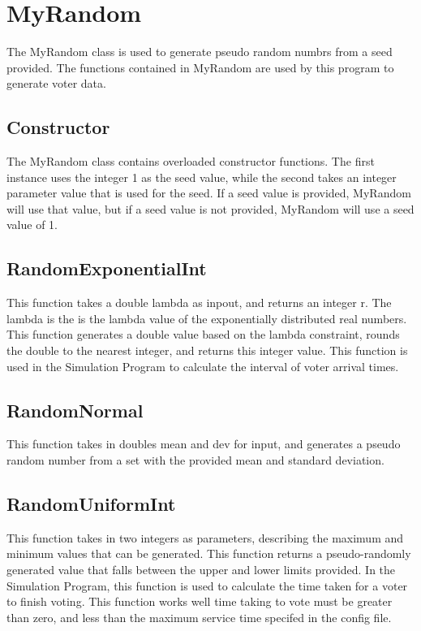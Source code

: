 %


\chapter{MyRandom}
The MyRandom class is used to generate pseudo random numbrs from a seed provided.  The functions contained in MyRandom are used by this program to generate voter data.

\vspace{-1.0cm}

\section{Constructor}
The MyRandom class contains overloaded constructor functions. The first instance uses the integer 1 as the seed value, while the second takes an integer parameter value that is used for the seed. 
If a seed value is provided, MyRandom will use that value, but if a seed value is not provided, MyRandom will use a seed value of 1.

\section{RandomExponentialInt}
This function takes a double lambda as inpout, and returns an integer r.  The lambda is the is the lambda value of the exponentially distributed real numbers.  This function generates a double value based on the lambda constraint, rounds the double to the nearest integer, and returns this integer value.
This function is used in the Simulation Program to calculate the interval of voter arrival times.


\section{RandomNormal}
This function takes in doubles mean and dev for input, and generates a pseudo random number from a set with the provided mean and standard deviation.


\section{RandomUniformInt}
This function takes in two integers as parameters, describing the maximum and minimum values that can be generated.  This function returns a pseudo-randomly generated value that falls between the upper and lower limits provided.
In the Simulation Program, this function is used to calculate the time taken for a voter to finish voting.  This function works well time taking to vote must be greater than zero, and less than the maximum service time specifed in the config file.


